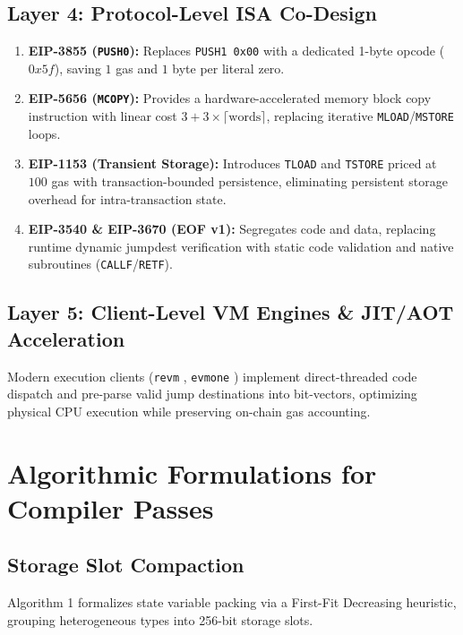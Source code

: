 \documentclass[conference]{IEEEtran}
\begin{document}
\subsection{Layer 4: Protocol-Level ISA Co-Design}
\begin{enumerate}
    \item \textbf{EIP-3855 (\texttt{PUSH0}):} Replaces \texttt{PUSH1 0x00} with a dedicated 1-byte opcode ($0x5f$), saving $1$ gas and $1$ byte per literal zero.
    \item \textbf{EIP-5656 (\texttt{MCOPY}):} Provides a hardware-accelerated memory block copy instruction with linear cost $3 + 3 \times \lceil \text{words} \rceil$, replacing iterative \texttt{MLOAD}/\texttt{MSTORE} loops.
    \item \textbf{EIP-1153 (Transient Storage):} Introduces \texttt{TLOAD} and \texttt{TSTORE} priced at $100$ gas with transaction-bounded persistence, eliminating persistent storage overhead for intra-transaction state.
    \item \textbf{EIP-3540 \& EIP-3670 (EOF v1):} Segregates code and data, replacing runtime dynamic jumpdest verification with static code validation and native subroutines (\texttt{CALLF}/\texttt{RETF}).
\end{enumerate}

\subsection{Layer 5: Client-Level VM Engines \& JIT/AOT Acceleration}
Modern execution clients (\texttt{revm} \cite{revm}, \texttt{evmone} \cite{evmone}) implement direct-threaded code dispatch and pre-parse valid jump destinations into bit-vectors, optimizing physical CPU execution while preserving on-chain gas accounting.

\section{Algorithmic Formulations for Compiler Passes}

\subsection{Storage Slot Compaction}
Algorithm 1 formalizes state variable packing via a First-Fit Decreasing heuristic, grouping heterogeneous types into 256-bit storage slots.
\end{document}
